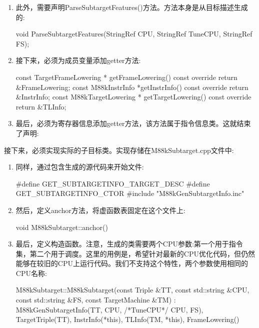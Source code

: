 \begin{enumerate}
\item
此外，需要声明ParseSubtargetFeatures()方法。方法本身是从目标描述生成的:

\begin{cpp}
    void ParseSubtargetFeatures(StringRef CPU,
                                StringRef TuneCPU,
                                StringRef FS);
\end{cpp}

\item
接下来，必须为成员变量添加getter方法:

\begin{cpp}
    const TargetFrameLowering *
    getFrameLowering() const override {
        return &FrameLowering;
    }
    const M88kInstrInfo *getInstrInfo() const override {
        return &InstrInfo;
    }
    const M88kTargetLowering *
    getTargetLowering() const override {
        return &TLInfo;
    }
\end{cpp}

\item
最后，必须为寄存器信息添加getter方法，该方法属于指令信息类。这就结束了声明:

\begin{cpp}
    const M88kRegisterInfo *
    getRegisterInfo() const override {
        return &InstrInfo.getRegisterInfo();
    }
};
} // end namespace llvm
\end{cpp}

\end{enumerate}

接下来，必须实现实际的子目标类。实现存储在M88kSubtarget.cpp文件中:

\begin{enumerate}
\item
同样，通过包含生成的源代码来开始文件:

\begin{cpp}
#define GET_SUBTARGETINFO_TARGET_DESC
#define GET_SUBTARGETINFO_CTOR
#include "M88kGenSubtargetInfo.inc"
\end{cpp}

\item
然后，定义anchor方法，将虚函数表固定在这个文件上:

\begin{cpp}
void M88kSubtarget::anchor() {}
\end{cpp}

\item
最后，定义构造函数。注意，生成的类需要两个CPU参数:第一个用于指令集，第二个用于调度。这里的用例是，希望针对最新的CPU优化代码，但仍然能够在较旧的CPU上运行代码。我们不支持这个特性，两个参数使用相同的CPU名称:

\begin{cpp}
M88kSubtarget::M88kSubtarget(const Triple &TT,
                             const std::string &CPU,
                             const std::string &FS,
                             const TargetMachine &TM)
    : M88kGenSubtargetInfo(TT, CPU, /*TuneCPU*/ CPU, FS),
      TargetTriple(TT), InstrInfo(*this),
      TLInfo(TM, *this), FrameLowering() {}
\end{cpp}
\end{enumerate}

